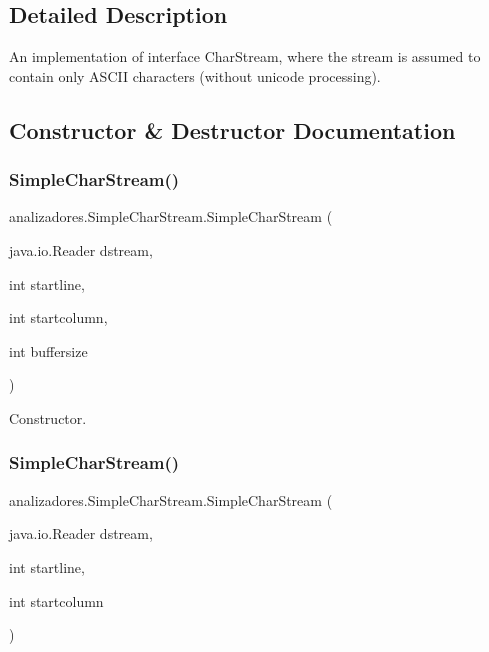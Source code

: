 \subsection{Detailed Description}
An implementation of interface Char\+Stream, where the stream is assumed to contain only A\+S\+C\+II characters (without unicode processing). 

\subsection{Constructor \& Destructor Documentation}
\mbox{\label{classanalizadores_1_1_simple_char_stream_a6debcff3bab58fc04e50fea277eddda6}} 
\subsubsection{\texorpdfstring{Simple\+Char\+Stream()}{SimpleCharStream()}\hspace{0.1cm}{\footnotesize\ttfamily [1/9]}}
{\footnotesize\ttfamily analizadores.\+Simple\+Char\+Stream.\+Simple\+Char\+Stream (\begin{DoxyParamCaption}\item[{java.\+io.\+Reader}]{dstream,  }\item[{int}]{startline,  }\item[{int}]{startcolumn,  }\item[{int}]{buffersize }\end{DoxyParamCaption})}

Constructor. \mbox{\label{classanalizadores_1_1_simple_char_stream_abd26499c5e2b7106edb3ce04085f5603}} 
\subsubsection{\texorpdfstring{Simple\+Char\+Stream()}{SimpleCharStream()}\hspace{0.1cm}{\footnotesize\ttfamily [2/9]}}
{\footnotesize\ttfamily analizadores.\+Simple\+Char\+Stream.\+Simple\+Char\+Stream (\begin{DoxyParamCaption}\item[{java.\+io.\+Reader}]{dstream,  }\item[{int}]{startline,  }\item[{int}]{startcolumn }\end{DoxyParamCaption})}

